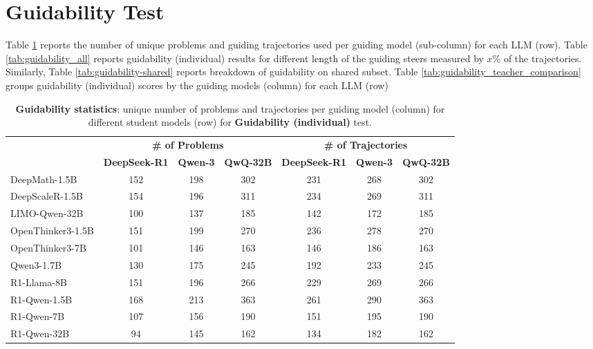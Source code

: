 \documentclass{article} %
\begin{document}
\section{Guidability Test}
\label{sec:appendix_guidability_test}

Table \ref{tab:guidability_support_statistics} reports the number of unique problems and guiding trajectories used per guiding model (sub-column) for each LLM (row). Table \ref{tab:guidability_all} reports guidability (individual) results for different length of the guiding steers measured by $x\%$ of the trajectories. Similarly, Table \ref{tab:guidability-shared} reports breakdown of guidability on shared subset. Table \ref{tab:guidability_teacher_comparison} groups guidability (individual) scores by the guiding models (column) for each LLM (row)

\begin{table}[ht!]
\centering
\small
\begin{tabular}{l|ccc|ccc}
\toprule
 & \multicolumn{3}{c|}{\textbf{\# of Problems}} & \multicolumn{3}{c}{\textbf{\# of Trajectories}} \\
 & \textbf{DeepSeek-R1} & \textbf{Qwen-3} & \textbf{QwQ-32B} & \textbf{DeepSeek-R1} & \textbf{Qwen-3} & \textbf{QwQ-32B} \\
\midrule
DeepMath-1.5B          & 152 & 198 & 302 & 231 & 268 & 302 \\
DeepScaleR-1.5B        & 154 & 196 & 311 & 234 & 269 & 311 \\
LIMO-Qwen-32B          & 100 & 137 & 185 & 142 & 172 & 185 \\
OpenThinker3-1.5B      & 151 & 199 & 270 & 236 & 278 & 270 \\
OpenThinker3-7B        & 101 & 146 & 163 & 146 & 186 & 163 \\
Qwen3-1.7B             & 130 & 175 & 245 & 192 & 233 & 245 \\
\midrule
R1-Llama-8B    & 151 & 196 & 266 & 229 & 269 & 266 \\
R1-Qwen-1.5B   & 168 & 213 & 363 & 261 & 290 & 363 \\
R1-Qwen-7B     & 107 & 156 & 190 & 151 & 195 & 190 \\
R1-Qwen-32B    &  94 & 145 & 162 & 134 & 182 & 162 \\
\bottomrule
\end{tabular}
\caption{\textbf{Guidability statistics}: unique number of problems and trajectories per guiding model (column) for different student models (row) for \textbf{Guidability (individual)} test.}
\label{tab:guidability_support_statistics}
\end{table}
\end{document}
